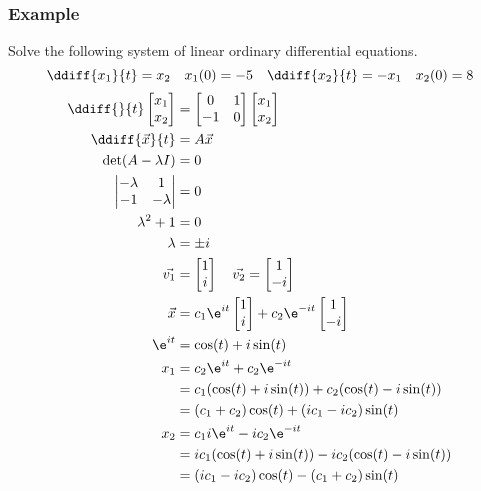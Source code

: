 \documentclass{math}
\begin{document}
\subsubsection*{Example}
Solve the following system of linear ordinary differential equations.
\[ \ddiff{x_1}{t} = x_2 \quad x_1(0) = -5 \quad \ddiff{x_2}{t} = -x_1 \quad
  x_2(0) = 8 \]
\begin{align*}
  \ddiff{}{t}\begin{bmatrix}x_1 \\ x_2\end{bmatrix} &= \begin{bmatrix}
    0 & 1 \\
    -1 & 0
  \end{bmatrix}\begin{bmatrix}x_1 \\ x_2\end{bmatrix} \\
  \ddiff{\vec{x}}{t} &= A\vec{x} \\
  \det(A-\lambda I) &= 0 \\
  \begin{vmatrix}
    -\lambda & 1 \\
    -1 & -\lambda
  \end{vmatrix} &= 0 \\
  \lambda^2+1 &= 0 \\
  \lambda &= \pm i \\
  \vec{v_1} &= \begin{bmatrix}1 \\ i\end{bmatrix} \quad
    \vec{v_2} = \begin{bmatrix}1 \\ -i\end{bmatrix} \\
  \vec{x} &= c_1\e^{it}\begin{bmatrix}1 \\ i\end{bmatrix}
    +c_2\e^{-it}\begin{bmatrix}1 \\ -i\end{bmatrix} \\
  \e^{it} &= \cos(t)+i\sin(t) \\
  x_1 &= c_2\e^{it}+c_2\e^{-it} \\
  &= c_1(\cos(t)+i\sin(t))+c_2(\cos(t)-i\sin(t)) \\
  &= (c_1+c_2)\cos(t)+(ic_1-ic_2)\sin(t) \\
  x_2 &= c_1i\e^{it}-ic_2\e^{-it} \\
  &= ic_1(\cos(t)+i\sin(t))-ic_2(\cos(t)-i\sin(t)) \\
  &=  (ic_1-ic_2)\cos(t)-(c_1+c_2)\sin(t)
\end{align*}
\end{document}
